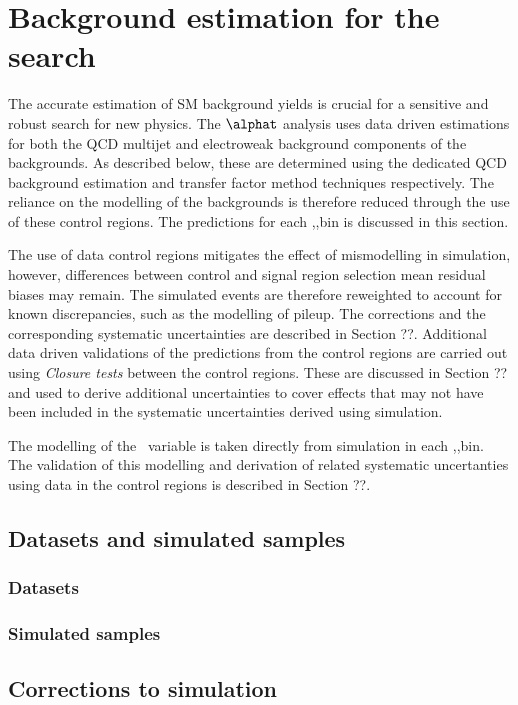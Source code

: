 \chapter{Background estimation for the \alphat search}

The accurate estimation of SM background yields is crucial for a sensitive and robust
search for new physics. The $\alphat$ analysis uses data driven estimations for both the
QCD multijet and electroweak background components of the backgrounds. As described below, 
these are determined using the dedicated QCD background estimation and transfer factor 
method techniques respectively. The reliance on the modelling of the backgrounds 
is therefore reduced through the use of these control regions. The predictions for
each \nj,\nb,\scalht bin is discussed in this section. 

The use of data control regions mitigates the effect of mismodelling in simulation, however,
differences between control and signal region selection mean residual biases may remain.
The simulated events are therefore reweighted to account for known discrepancies, 
such as the modelling of pileup. The corrections and the corresponding systematic uncertainties
are described in Section ??. Additional data driven validations of the predictions from the
control regions are carried out using \emph{Closure tests} between the control regions. 
These are discussed in Section ?? and used to derive additional uncertainties to cover effects 
that may not have been included in the systematic uncertainties derived using simulation.

The modelling of the \mht~variable is taken directly from simulation in each \nj,\nb,\scalht bin.
The validation of this modelling and derivation of related systematic uncertanties using
data in the control regions is described in Section ??.

\section{Datasets and simulated samples}
\subsection{Datasets}
\subsection{Simulated samples}
\section{Corrections to simulation}
